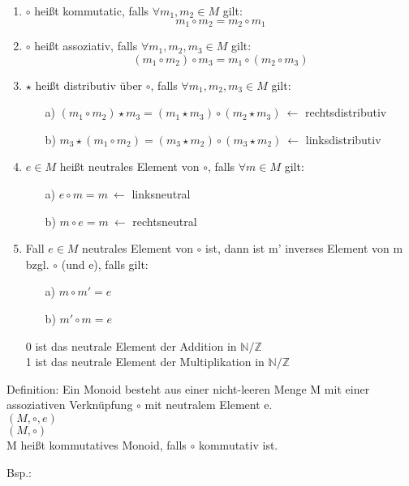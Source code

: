 \documentclass[bibtotoc,11pt,a4paper,]{scrartcl}
\begin{document}
        \begin{enumerate}
            \item $\circ$ heißt kommutatic, falls $\forall m_1, m_2 \in M$ gilt:
            \begin{equation*}
                m_1 \circ m_2 = m_2 \circ m_1
            \end{equation*}
            
            \item $\circ$ heißt assoziativ, falls $\forall m_1, m_2, m_3 \in M$ gilt:
            \begin{equation*}
                (m_1 \circ m_2) \circ m_3 = m_1 \circ (m_2 \circ m_3)
            \end{equation*}
            
            \item $\star$ heißt distributiv über $\circ$, falls $\forall m_1, m_2, m_3 \in M$ gilt:
            \begin{itemize}
                \item[a)] $(m_1 \circ m_2) \star m_3 = (m_1 \star m_3) \circ (m_2 \star m_3)\ \leftarrow$ rechtsdistributiv
                \item[b)] $m_3 \star (m_1 \circ m_2) = (m_3 \star m_2) \circ (m_3 \star m_2)\ \leftarrow$ linksdistributiv
            \end{itemize}
            
            \item $e \in M$ heißt neutrales Element von $\circ$, falls $\forall m \in M$ gilt:
            \begin{itemize}
                \item[a)] $e \circ m = m\ \leftarrow$ linksneutral
                \item[b)] $m \circ e = m\ \leftarrow$ rechtsneutral
            \end{itemize}
            
            \item Fall $e \in M$ neutrales Element von $\circ$ ist, dann ist m' inverses Element von m bzgl. $\circ$ (und e), falls gilt:
            \begin{itemize}
                \item[a)] $m \circ m' = e$
                \item[b)] $m' \circ m = e$
            \end{itemize}
            
            0 ist das neutrale Element der Addition in $\mathbb{N}/\mathbb{Z}$\\
            1 ist das neutrale Element der Multiplikation in $\mathbb{N}/\mathbb{Z}$
        \end{enumerate}
      
      
      Definition: Ein Monoid besteht aus einer nicht-leeren Menge M mit einer assoziativen Verknüpfung $\circ$ mit neutralem Element e.\\
      $(M, \circ, e)$\\
      $(M, \circ)$\\
      M heißt kommutatives Monoid, falls $\circ$ kommutativ ist.
      
      Bsp.:
\end{document}
